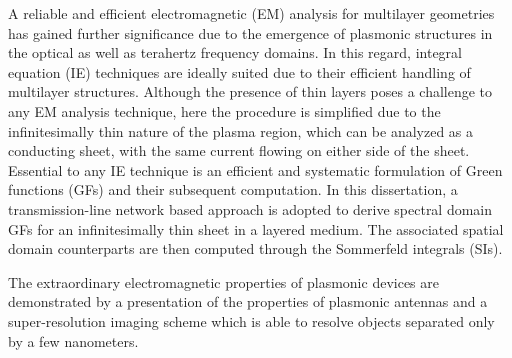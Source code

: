 A reliable and efficient electromagnetic (EM) analysis for multilayer geometries has gained further significance due to the emergence of plasmonic structures in the optical as well as terahertz frequency domains. In this regard, integral equation (IE) techniques are ideally suited due to their efficient handling of multilayer structures. Although the presence of thin layers poses a challenge to any EM analysis technique, here the procedure is simplified due to the infinitesimally thin nature of the plasma region, which can be analyzed as a conducting sheet, with the same current flowing on either side of the sheet. Essential to any IE technique is an efficient and systematic formulation of Green functions (GFs) and their subsequent computation. In this dissertation, a transmission-line network based approach is adopted to derive spectral domain GFs for an infinitesimally thin sheet in a layered medium. The associated spatial domain counterparts are then computed through the Sommerfeld integrals (SIs).

The extraordinary electromagnetic properties of plasmonic devices are demonstrated by a presentation of the properties of plasmonic antennas and a super-resolution imaging scheme which is able to resolve objects separated only by a few nanometers.

\pagebreak{}
